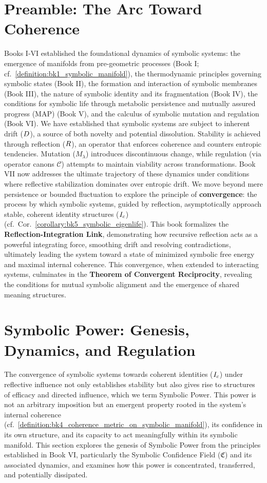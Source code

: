 \section{Preamble: The Arc Toward Coherence}
\label{sec:bk7_preamble_the_arc_toward_coherence} %
Books I-VI established the foundational dynamics of symbolic systems: the emergence of manifolds from pre-geometric processes (Book I; cf.~\ref{definition:bk1_symbolic_manifold}), the thermodynamic principles governing symbolic states (Book II), the formation and interaction of symbolic membranes (Book III), the nature of symbolic identity and its fragmentation (Book IV), the conditions for symbolic life through metabolic persistence and mutually assured progress (MAP) (Book V), and the calculus of symbolic mutation and regulation (Book VI).
We have established that symbolic systems are subject to inherent drift (\(D\)), a source of both novelty and potential dissolution. Stability is achieved through reflection (\(R\)), an operator that enforces coherence and counters entropic tendencies. Mutation (\(M_\lambda\)) introduces discontinuous change, while regulation (via operator canons \(\mathcal{C}\)) attempts to maintain viability across transformations.
Book VII now addresses the ultimate trajectory of these dynamics under conditions where reflective stabilization dominates over entropic drift. We move beyond mere persistence or bounded fluctuation to explore the principle of \textbf{convergence}: the process by which symbolic systems, guided by reflection, asymptotically approach stable, coherent identity structures (\(I_c\)) (cf.~Cor.~\ref{corollary:bk5_symbolic_eigenlife}). This book formalizes the \textbf{Reflection-Integration Link}, demonstrating how recursive reflection acts as a powerful integrating force, smoothing drift and resolving contradictions, ultimately leading the system toward a state of minimized symbolic free energy and maximal internal coherence. This convergence, when extended to interacting systems, culminates in the \textbf{Theorem of Convergent Reciprocity}, revealing the conditions for mutual symbolic alignment and the emergence of shared meaning structures.

\section{Symbolic Power: Genesis, Dynamics, and Regulation}
\label{sec:bk7_symbolic_power_genesis_dynamics_regulation}
The convergence of symbolic systems towards coherent identities (\(I_c\)) under reflective influence not only establishes stability but also gives rise to structures of efficacy and directed influence, which we term Symbolic Power. This power is not an arbitrary imposition but an emergent property rooted in the system's internal coherence (cf.~\ref{definition:bk4_coherence_metric_on_symbolic_manifold}), its confidence in its own structure, and its capacity to act meaningfully within its symbolic manifold. This section explores the genesis of Symbolic Power from the principles established in Book VI, particularly the Symbolic Confidence Field (\(\mathfrak{C}\)) and its associated dynamics, and examines how this power is concentrated, transferred, and potentially dissipated.

